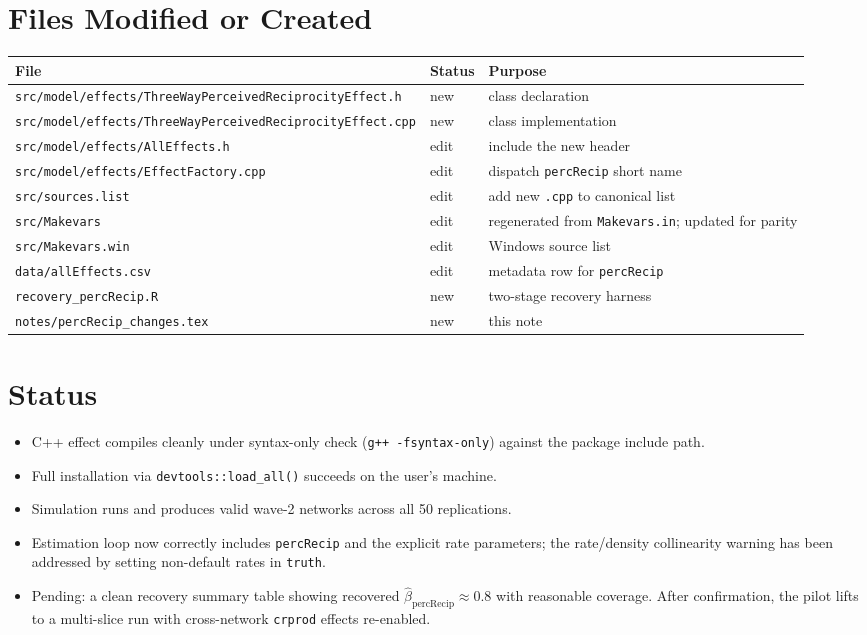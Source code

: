 \documentclass[11pt]{article}
\newcommand{\file}[1]{\texttt{#1}}
\begin{document}
\section{Files Modified or Created}

\begin{tabular}{@{}lll@{}}
\toprule
File & Status & Purpose \\
\midrule
\file{src/model/effects/ThreeWayPerceivedReciprocityEffect.h}
  & new & class declaration \\
\file{src/model/effects/ThreeWayPerceivedReciprocityEffect.cpp}
  & new & class implementation \\
\file{src/model/effects/AllEffects.h}
  & edit & include the new header \\
\file{src/model/effects/EffectFactory.cpp}
  & edit & dispatch \texttt{percRecip} short name \\
\file{src/sources.list}
  & edit & add new \texttt{.cpp} to canonical list \\
\file{src/Makevars}
  & edit & regenerated from \file{Makevars.in}; updated for parity \\
\file{src/Makevars.win}
  & edit & Windows source list \\
\file{data/allEffects.csv}
  & edit & metadata row for \texttt{percRecip} \\
\file{recovery\_percRecip.R}
  & new & two-stage recovery harness \\
\file{notes/percRecip\_changes.tex}
  & new & this note \\
\bottomrule
\end{tabular}

\section{Status}

\begin{itemize}[leftmargin=*]
  \item C++ effect compiles cleanly under syntax-only check
        (\texttt{g++ -fsyntax-only}) against the package include path.
  \item Full installation via \texttt{devtools::load\_all()} succeeds
        on the user's machine.
  \item Simulation runs and produces valid wave-2 networks across all
        50 replications.
  \item Estimation loop now correctly includes \texttt{percRecip} and
        the explicit rate parameters; the rate/density collinearity
        warning has been addressed by setting non-default rates in
        \texttt{truth}.
  \item Pending: a clean recovery summary table showing recovered
        $\hat\beta_{\text{percRecip}} \approx 0.8$ with reasonable
        coverage.  After confirmation, the pilot lifts to a multi-slice
        run with cross-network \texttt{crprod} effects re-enabled.
\end{itemize}
\end{document}
